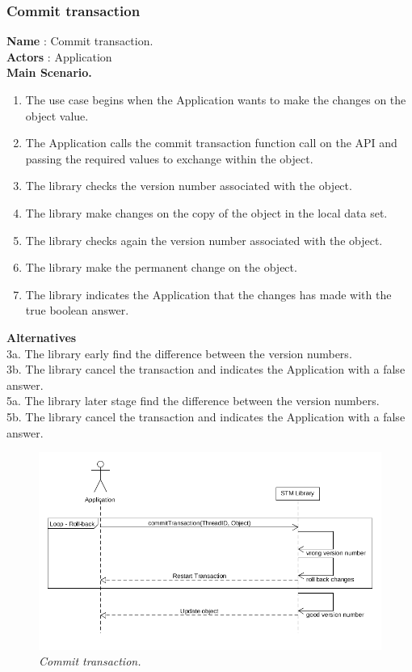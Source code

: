 \documentclass[12pt]{article}
\begin{document}
{\subsubsection{Commit transaction}
\textbf{Name} : Commit transaction.\\
\textbf{Actors} : Application\\
\textbf{Main Scenario.}
\begin{enumerate}
  \item The use case begins when the Application wants to make the changes on the object value.
  \item The Application calls the commit transaction function call on the API and passing the required values to exchange within the object.
  \item The library checks the version number associated with the object.
  \item The library make changes on the copy of the object in the local data set.
  \item The library checks again the version number associated with the object. 
  \item The library make the permanent change on the object.
  \item The library indicates the Application that the changes has made with the true boolean answer.
\end{enumerate}
\textbf{Alternatives}\\
3a. The library early find the difference between the version numbers.\\
3b. The library cancel the transaction and indicates the Application with a false answer.\\
5a. The library later stage find the difference between the version numbers.\\
5b. The library cancel the transaction and indicates the Application with a false answer.\\

\begin{figure}[h!]
\centering
\includegraphics[scale=0.5]{Pictures/commit.png}
\caption{\textit{\color{gray}Commit transaction.}}
\end{figure}

}
\end{document}
